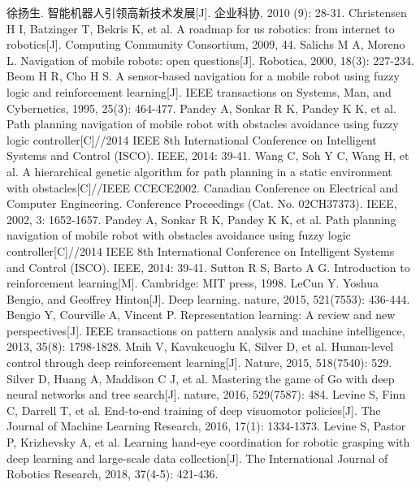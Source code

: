 \documentclass[12pt,a4paper,openany,oneside]{book}
\begin{document}
{\renewcommand\baselinestretch{1.25}\selectfont


\begin{thebibliography}{999}
\addtolength{\itemsep}{-1.05 em} %
\setlength{\itemsep}{1pt}
徐扬生. 智能机器人引领高新技术发展[J]. 企业科协, 2010 (9): 28-31.
Christensen H I, Batzinger T, Bekris K, et al. A roadmap for us robotics: from internet to robotics[J]. Computing Community Consortium, 2009, 44.
Salichs M A, Moreno L. Navigation of mobile robots: open questions[J]. Robotica, 2000, 18(3): 227-234.
Beom H R, Cho H S. A sensor-based navigation for a mobile robot using fuzzy logic and reinforcement learning[J]. IEEE transactions on Systems, Man, and Cybernetics, 1995, 25(3): 464-477.
Pandey A, Sonkar R K, Pandey K K, et al. Path planning navigation of mobile robot with obstacles avoidance using fuzzy logic controller[C]//2014 IEEE 8th International Conference on Intelligent Systems and Control (ISCO). IEEE, 2014: 39-41.
Wang C, Soh Y C, Wang H, et al. A hierarchical genetic algorithm for path planning in a static environment with obstacles[C]//IEEE CCECE2002. Canadian Conference on Electrical and Computer Engineering. Conference Proceedings (Cat. No. 02CH37373). IEEE, 2002, 3: 1652-1657.
Pandey A, Sonkar R K, Pandey K K, et al. Path planning navigation of mobile robot with obstacles avoidance using fuzzy logic controller[C]//2014 IEEE 8th International Conference on Intelligent Systems and Control (ISCO). IEEE, 2014: 39-41.
Sutton R S, Barto A G. Introduction to reinforcement learning[M]. Cambridge: MIT press, 1998.
LeCun Y. Yoshua Bengio, and Geoffrey Hinton[J]. Deep learning. nature, 2015, 521(7553): 436-444.
Bengio Y, Courville A, Vincent P. Representation learning: A review and new perspectives[J]. IEEE transactions on pattern analysis and machine intelligence, 2013, 35(8): 1798-1828.
Mnih V, Kavukcuoglu K, Silver D, et al. Human-level control through deep reinforcement learning[J]. Nature, 2015, 518(7540): 529.
Silver D, Huang A, Maddison C J, et al. Mastering the game of Go with deep neural networks and tree search[J]. nature, 2016, 529(7587): 484.
Levine S, Finn C, Darrell T, et al. End-to-end training of deep visuomotor policies[J]. The Journal of Machine Learning Research, 2016, 17(1): 1334-1373.
Levine S, Pastor P, Krizhevsky A, et al. Learning hand-eye coordination for robotic grasping with deep learning and large-scale data collection[J]. The International Journal of Robotics Research, 2018, 37(4-5): 421-436.

\end{thebibliography}}
\end{document}

